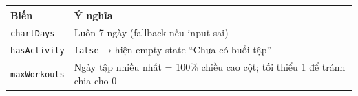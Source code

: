 \documentclass[12pt,a4paper]{article}
\begin{document}
\begin{Shaded}
\begin{Highlighting}[]
\OperatorTok{=} \NormalTok{(}
\NormalTok{  () }\KeywordTok{=\textgreater{}} \OperatorTok{===}  \OperatorTok{:} \NormalTok{())}\OperatorTok{,}
\NormalTok{  [days]}\OperatorTok{,}
\NormalTok{)}\OperatorTok{;}
\OperatorTok{=}\OperatorTok{,}\KeywordTok{=\textgreater{}}\OperatorTok{+}\OperatorTok{,} \NormalTok{)}\OperatorTok{;}
\OperatorTok{=}\OperatorTok{\textgreater{}} \OperatorTok{;}
\OperatorTok{=} \NormalTok{(}\KeywordTok{=\textgreater{}}\NormalTok{)}\OperatorTok{,} \NormalTok{)}\OperatorTok{;}
\end{Highlighting}
\end{Shaded}

{\def\LTcaptype{none} %
\begin{longtable}[]{@{}
  >{\raggedright\arraybackslash}p{}
  >{\raggedright\arraybackslash}p{}@{}}
\toprule\noalign{}
\begin{minipage}[b]{\linewidth}\raggedright
Biến
\end{minipage} & \begin{minipage}[b]{\linewidth}\raggedright
Ý nghĩa
\end{minipage} \\
\midrule\noalign{}
\endhead
\bottomrule\noalign{}
\endlastfoot
\texttt{chartDays} & Luôn 7 ngày (fallback nếu input sai) \\
\texttt{hasActivity} & \texttt{false} → hiện empty state ``Chưa có buổi
tập'' \\
\texttt{maxWorkouts} & Ngày tập nhiều nhất = 100\% chiều cao cột; tối
thiểu 1 để tránh chia cho 0 \\
\end{longtable}
}
\end{document}
